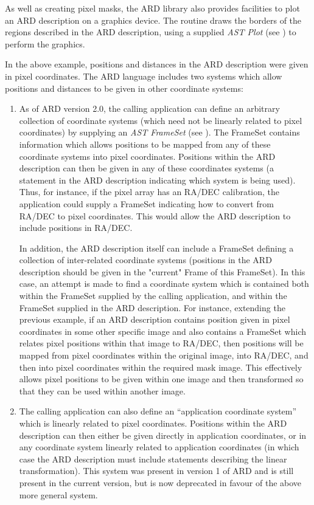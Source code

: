 \documentclass[11pt]{starlink}
\begin{document}
As well as creating pixel masks, the ARD library also provides facilities
to plot an ARD description on a graphics device. The 
routine draws the borders of the regions described in the ARD description,
using a supplied \emph{AST Plot} (see ) to perform
the graphics.

In the above example, positions and distances in the ARD description were given
in pixel coordinates. The ARD language includes two systems which allow
positions and distances to be given in other coordinate systems:
\begin{enumerate}

\item As of ARD version 2.0, the calling application can define an
arbitrary collection of coordinate systems (which need not be linearly
related to pixel coordinates) by supplying an \emph{AST FrameSet} (see
). The FrameSet contains information which allows
positions to be mapped from any of these coordinate systems into pixel
coordinates. Positions within the ARD description can then be given
in any of these coordinates systems (a statement in the ARD description
indicating which system is being used). Thus, for instance, if the pixel
array has an RA/DEC calibration, the application could supply a FrameSet
indicating how to convert from RA/DEC to pixel coordinates. This would
allow the ARD description to include positions in RA/DEC.

In addition, the ARD description itself can include a FrameSet defining
a collection of inter-related coordinate systems (positions in the ARD
description should be given in the "current" Frame of this FrameSet). In
this case, an attempt is made to find a coordinate system which is
contained both within the FrameSet supplied by the calling application,
and within the FrameSet supplied in the ARD description. For instance,
extending the previous example, if an ARD description contains position
given in pixel coordinates in some other specific image and also contains a
FrameSet which relates pixel positions within that image to RA/DEC, then
positions will be mapped from pixel coordinates within the original
image, into RA/DEC, and then into pixel coordinates within the required
mask image. This effectively allows pixel positions to be given within
one image and then transformed so that they can be used within another
image.

\item The calling application can also define an ``application coordinate
system'' which is linearly related to pixel coordinates. Positions within the
ARD description can then either be given directly in application coordinates,
or in any coordinate system linearly related to application coordinates
(in which case the ARD description must include statements describing the
linear transformation). This system was present in version 1 of ARD and
is still present in the current version, but is now deprecated in favour
of the above more general system.

\end{enumerate}
\end{document}
